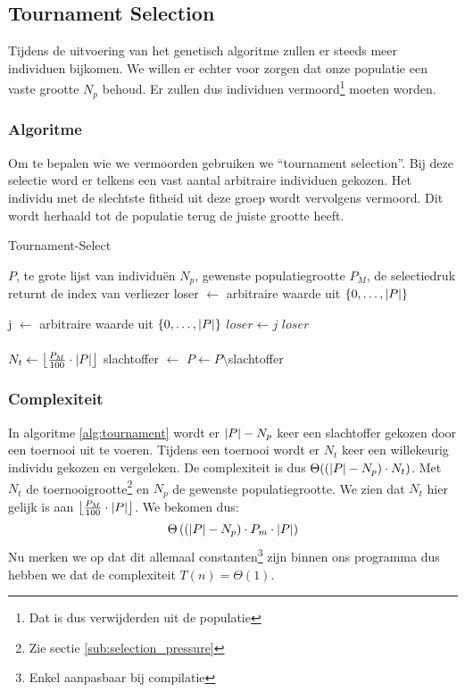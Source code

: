 %
\subsection{Tournament Selection}
\label{sub:tournament}
Tijdens de uitvoering van het genetisch algoritme zullen er steeds meer individuen bijkomen. We willen er echter voor zorgen dat onze populatie een vaste grootte $N_p$ behoud. Er zullen dus individuen vermoord\footnote{Dat is dus verwijderden uit de populatie} moeten worden.
\subsubsection{Algoritme}
Om te bepalen wie we vermoorden gebruiken we ``tournament selection''. Bij deze selectie word er telkens een vast aantal arbitraire individuen gekozen. Het individu met de slechtste fitheid uit deze groep wordt vervolgens vermoord. Dit wordt herhaald tot de populatie terug de juiste grootte heeft.
	\begin{algorithm}
	 	\caption{Tournament-Select}
		\begin{algorithmic}
		\Require 
			\State $P$, te grote lijst van individuën 
			\State $N_p$, gewenste populatiegrootte
			\State $P_M$, de selectiedruk
		\Ensure returnt de index van verliezer
		\State loser $\gets$ arbitraire waarde uit $\lbrace 0, \dots, \lvert P \rvert \rbrace$

		\State j $\gets$ arbitraire waarde uit $\lbrace 0, \dots, \lvert P \rvert \rbrace$
			\State $loser \gets j$
		\EndIf
		\EndFor		
		\State \Return $loser$
		\EndFunction
		\\
		\\
			\State $N_t \gets \left\lfloor\frac{P_M}{100} \cdot \lvert P \rvert\right\rfloor$ 
			\State slachtoffer $\gets$ 
			\State $P \gets P\setminus$slachtoffer
		\EndWhile
		
		\end{algorithmic}
		\label{alg:tournament}
	\end{algorithm}		
\subsubsection{Complexiteit}
In algoritme \ref{alg:tournament} wordt er $\lvert P \rvert-N_p$ keer een slachtoffer gekozen door een toernooi uit te voeren. Tijdens een toernooi wordt er $N_t$ keer een willekeurig individu gekozen en vergeleken. De complexiteit is dus $\Theta((\lvert P \rvert-N_p)\cdot N_t)$. Met $N_t$ de toernooigrootte\footnote{Zie sectie \ref{sub:selection_pressure}} en $N_p$ de gewenste populatiegrootte. We zien dat $N_t$ hier gelijk is aan
 $\left\lfloor\frac{P_M}{100} \cdot \lvert P \rvert\right\rfloor$.
 We bekomen dus: \[\Theta\left(\left(\lvert P \rvert-N_p\right)\cdot P_m \cdot \lvert P \rvert\right)\]
 Nu merken we op dat dit allemaal constanten\footnote{Enkel aanpasbaar bij compilatie} zijn binnen ons programma dus hebben we dat de complexiteit $T(n) = \Theta(1)$. 

